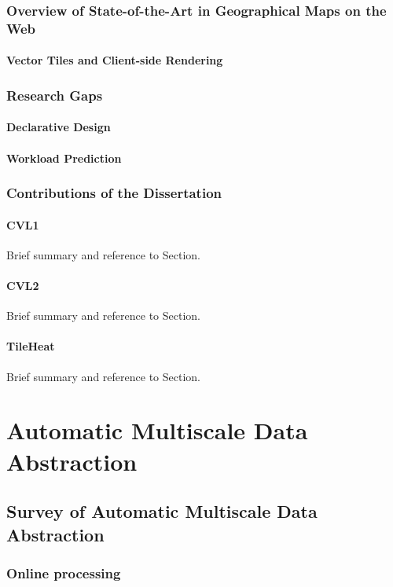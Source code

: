 \documentclass[11pt, oneside]{report}   	%
\begin{document}
\section{Overview of State-of-the-Art in Geographical Maps on the Web}
\subsection{Vector Tiles and Client-side Rendering}

\section{Research Gaps}
\subsection{Declarative Design}
\subsection{Workload Prediction}

\section{Contributions of the Dissertation}

\subsection{CVL1}
Brief summary and reference to Section.
\subsection{CVL2}
Brief summary and reference to Section.
\subsection{TileHeat}
Brief summary and reference to Section.


\part{Automatic Multiscale Data Abstraction}

\chapter{Survey of Automatic Multiscale Data Abstraction}

\section{Online processing}
\end{document}
